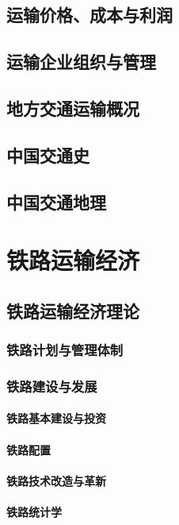 \documentclass[UTF8]{../../RepresentationUniverse}
\begin{document}
\section{运输价格、成本与利润}
\section{运输企业组织与管理}
\section{地方交通运输概况}
\section{中国交通史}
\section{中国交通地理}



\chapter{铁路运输经济}

\section{铁路运输经济理论}
    \subsection{铁路计划与管理体制}
    \subsection{铁路建设与发展}
        \subsubsection{铁路基本建设与投资}
        \subsubsection{铁路配置}
        \subsubsection{铁路技术改造与革新}
        \subsubsection{铁路统计学}
\end{document}

